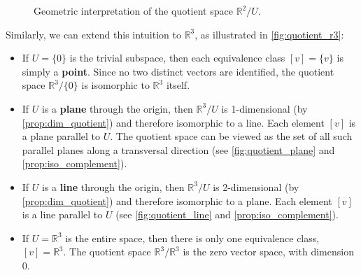 \begin{figure}[ht!]
  \centering
  \caption{Geometric interpretation of the quotient space $\mathbb{R}^2/U$.}
  \label{fig:quotient_r2}
\end{figure}

Similarly, we can extend this intuition to $\mathbb{R}^3$, as illustrated in \cref{fig:quotient_r3}:
\begin{itemize}
  \item If $U = \{0\}$ is the trivial subspace, then each equivalence class $[v] = \{v\}$ is simply a \textbf{point}. Since no two distinct vectors are identified, the quotient space $\mathbb{R}^3/\{0\}$ is isomorphic to $\mathbb{R}^3$ itself.
  \item If $U$ is a \textbf{plane} through the origin, then $\mathbb{R}^3/U$ is 1-dimensional (by \cref{prop:dim_quotient}) and therefore isomorphic to a line. Each element $[v]$ is a plane parallel to $U$. The quotient space can be viewed as the set of all such parallel planes  along a transversal direction (see \cref{fig:quotient_plane} and \cref{prop:iso_complement}).
  \item If $U$ is a \textbf{line} through the origin, then $\mathbb{R}^3/U$ is 2-dimensional (by \cref{prop:dim_quotient}) and therefore isomorphic to a plane. Each element $[v]$ is a line parallel to $U$ (see \cref{fig:quotient_line} and \cref{prop:iso_complement}).
  \item If $U = \mathbb{R}^3$ is the entire space, then there is only one equivalence class, $[v] = \mathbb{R}^3$. The quotient space $\mathbb{R}^3/\mathbb{R}^3$ is the zero vector space, with dimension $0$.
\end{itemize}


